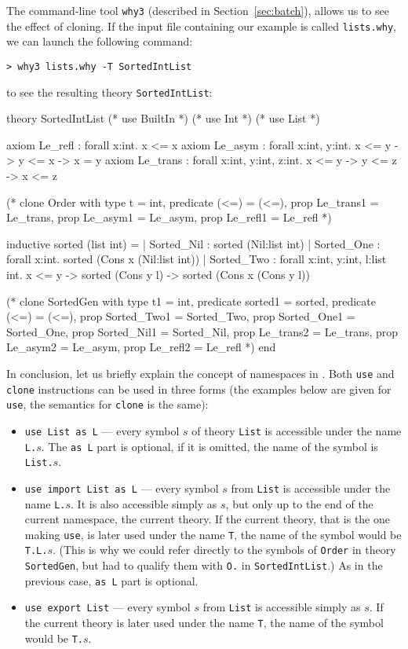 The command-line tool \texttt{why3} (described in
Section~\ref{sec:batch}), allows us to see the effect of cloning.
If the input file containing our example is called \texttt{lists.why},
we can launch the following command:
\begin{verbatim}
> why3 lists.why -T SortedIntList
\end{verbatim}
to see the resulting theory \texttt{SortedIntList}:
\begin{whycode}
theory SortedIntList
  (* use BuiltIn *)
  (* use Int *)
  (* use List *)

  axiom Le_refl : forall x:int. x <= x
  axiom Le_asym : forall x:int, y:int. x <= y -> y <= x -> x = y
  axiom Le_trans : forall x:int, y:int, z:int. x <= y -> y <= z
    -> x <= z

  (* clone Order with type t = int, predicate (<=) = (<=),
    prop Le_trans1 = Le_trans, prop Le_asym1 = Le_asym,
    prop Le_refl1 = Le_refl *)

  inductive sorted (list int) =
    | Sorted_Nil : sorted (Nil:list int)
    | Sorted_One : forall x:int. sorted (Cons x (Nil:list int))
    | Sorted_Two : forall x:int, y:int, l:list int. x <= y ->
        sorted (Cons y l) -> sorted (Cons x (Cons y l))

  (* clone SortedGen with type t1 = int, predicate sorted1 = sorted,
    predicate (<=) = (<=), prop Sorted_Two1 = Sorted_Two,
    prop Sorted_One1 = Sorted_One, prop Sorted_Nil1 = Sorted_Nil,
    prop Le_trans2 = Le_trans, prop Le_asym2 = Le_asym,
    prop Le_refl2 = Le_refl *)
end
\end{whycode}

In conclusion, let us briefly explain the concept of namespaces
in \why. Both \texttt{use} and \texttt{clone} instructions can
be used in three forms (the examples below are given for \texttt{use},
the semantics for \texttt{clone} is the same):
\begin{itemize}
\item \texttt{use List as L} --- every symbol $s$ of theory \texttt{List}
is accessible under the name \texttt{L.$s$}. The \texttt{as L} part is
optional, if it is omitted, the name of the symbol is \texttt{List.$s$}.

\item \texttt{use import List as L} --- every symbol $s$ from
\texttt{List} is accessible under the name \texttt{L.$s$}. It is also
accessible simply as \texttt{$s$}, but only up to the end of the current
namespace, \eg the current theory. If the current theory, that is the
one making \texttt{use}, is later used under the name \texttt{T},
the name of the symbol would be \texttt{T.L.$s$}. (This is why we
could refer directly to the symbols of \texttt{Order} in theory
\texttt{SortedGen}, but had to qualify them with \texttt{O.}
in \texttt{SortedIntList}.)
As in the previous case, \texttt{as L} part is optional.

\item \texttt{use export List} --- every symbol $s$ from \texttt{List}
is accessible simply as \texttt{$s$}. If the current theory
is later used under the name \texttt{T}, the name of the symbol
would be \texttt{T.$s$}.
\end{itemize}

